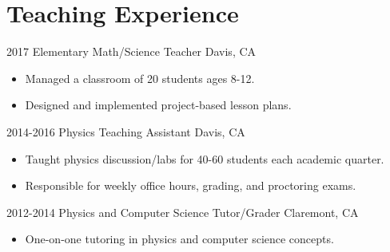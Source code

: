 \documentclass[]{cv-style}          %
\begin{document}
\section{Teaching Experience}
\begin{entrylist}

  \entry
      {2017}
      {Elementary Math/Science Teacher}
      {Davis, CA}
      {
        \begin{itemize}
        \item Managed a classroom of 20 students ages 8-12.
        \item Designed and implemented project-based lesson plans.\\
          \end{itemize}}
\entry
  {2014-2016}
  {Physics Teaching Assistant}
  {Davis, CA}
  {
  \begin{itemize}
    \item Taught physics discussion/labs for 40-60 students each academic quarter.
    \item Responsible for weekly office hours, grading, and proctoring exams.\\
  \end{itemize}}
\entry
  {2012-2014}
  {Physics and Computer Science Tutor/Grader}
  {Claremont, CA}
  {
  \begin{itemize}
    \item One-on-one tutoring in physics and computer science concepts.\\
  \end{itemize}}

\end{entrylist}

\end{document}

